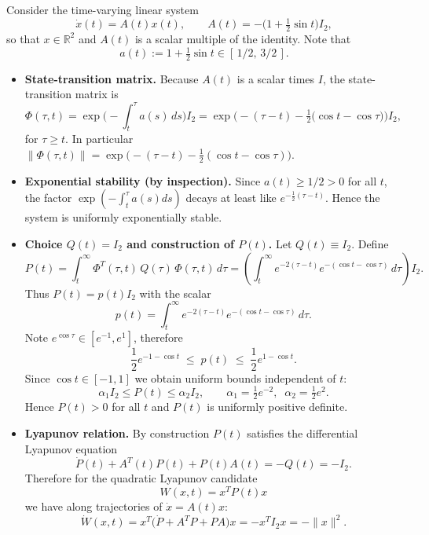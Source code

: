 \begin{example}
Consider the time-varying linear system
\[
\dot x(t)=A(t)x(t),\qquad A(t) = -\big(1+\tfrac{1}{2}\sin t\big) I_{2},
\]
so that \(x\in\mathbb{R}^2\) and \(A(t)\) is a scalar multiple of the identity. Note that
\[
a(t):=1+\tfrac{1}{2}\sin t \in [\,1/2,\,3/2\,].
\]

\begin{itemize}
    \item \textbf{State-transition matrix.} Because \(A(t)\) is a scalar times \(I\), the state-transition matrix is
    \[
    \Phi(\tau,t)=\exp\bigg(-\int_{t}^{\tau} a(s)\,ds\bigg) I_2
    =\exp\!\Big(-( \tau-t ) -\tfrac{1}{2}\big(\cos t-\cos\tau\big)\Big) I_2,
    \]
    for \(\tau\ge t\). In particular \(\|\Phi(\tau,t)\|= \exp\big(-( \tau-t ) -\tfrac{1}{2}(\cos t-\cos\tau)\big)\).
    
    \item \textbf{Exponential stability (by inspection).} Since \(a(t)\ge 1/2>0\) for all \(t\), the factor \(\exp(-\int_t^\tau a(s)ds)\) decays at least like \(e^{-\tfrac{1}{2}(\tau-t)}\). Hence the system is uniformly exponentially stable.
    
    \item \textbf{Choice \(Q(t)=I_2\) and construction of \(P(t)\).} Let \(Q(t)\equiv I_2\). Define
    \[
    P(t)=\int_{t}^{\infty}\Phi^{T}(\tau,t)\,Q(\tau)\,\Phi(\tau,t)\,d\tau
    =\left(\int_t^{\infty} e^{-2(\tau-t)} e^{-(\cos t-\cos\tau)}\,d\tau\right) I_2.
    \]
    Thus \(P(t)=p(t) I_2\) with the scalar
    \[
    p(t)=\int_t^{\infty} e^{-2(\tau-t)} e^{-(\cos t-\cos\tau)}\,d\tau.
    \]
    Note \(e^{\cos\tau}\in[e^{-1},e^{1}]\), therefore
    \[
    \frac{1}{2} e^{-1-\cos t} \;\le\; p(t) \;\le\; \frac{1}{2} e^{1-\cos t}.
    \]
    Since \(\cos t\in[-1,1]\) we obtain uniform bounds independent of \(t\):
    \[
    \alpha_1 I_2 \le P(t) \le \alpha_2 I_2,\qquad
    \alpha_1=\tfrac{1}{2}e^{-2},\;\; \alpha_2=\tfrac{1}{2}e^{2}.
    \]
    Hence \(P(t)>0\) for all \(t\) and \(P(t)\) is uniformly positive definite.
    
    \item \textbf{Lyapunov relation.} By construction \(P(t)\) satisfies the differential Lyapunov equation
    \[
    \dot P(t) + A^T(t)P(t) + P(t)A(t) = -Q(t) = -I_2.
    \]
    Therefore for the quadratic Lyapunov candidate
    \[
    W(x,t)=x^T P(t) x
    \]
    we have along trajectories of \(\dot x = A(t)x\):
    \[
    \dot W(x,t) = x^T\big(\dot P + A^TP + PA\big)x = -x^T I_2 x = -\|x\|^2.
    \]
    

\end{itemize}
\end{example}
